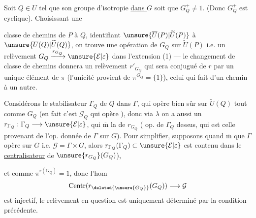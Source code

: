 Soit  $Q\in U$ tel que son groupe d'isotropie   \uline{dans $G$} soit  que $G_Q^+\ne1$.
(Donc $G_Q^+$ est cyclique). Choisissant une

classe de chemins \inserted{$\lambda$} de $P$ à $Q$, identifiant $\unsure{\overline U(P)|\widetilde U(P)}$ à $\unsure{\overline U(Q)|\widetilde U(Q)}$, on trouve une opération de $G_Q$ sur $\widetilde U(P)$ i.e. un relèvement $G_Q\xrightarrow{r_{G_Q}}\unsure{\mathcal E|\varepsilon}$ dans l'extension (1) --- le changement de classe de chemins  donnera un relèvement $r'_{G_Q}$ qui  sera conjugué de $r$ par un unique élément de $\pi$  (l'unicité provient de $\pi^{G_Q}=\{1\}$),  celui qui fait  d'un chemin à un autre.

Considérons le stabilisateur $\Gamma_Q$ de $Q$ dans $\Gamma$,  qui opère bien sûr sur $\widetilde U(Q)$ tout comme $G_Q$ (en fait c'est $\mathcal G_Q$ qui opère  \unsure{\dots}), donc via $\lambda$ on a aussi un  $r_{\Gamma_Q}:\Gamma_Q\longrightarrow\unsure{\mathcal E|\varepsilon}$, qui  $\overline{\mathrm m}$ la  de  $r_{G_Q}$ ( op. de  $\Gamma_Q$ dessus, qui est celle provenant de l'op. donnée de $\Gamma$ sur $G$).
Pour simplifier, supposons quand $\overline{\mathrm m}$ que $\Gamma$ opère  sur $G$ i.e. $\mathcal G=\Gamma\times G$, alors $r_{\Gamma_Q}(\Gamma_Q)\subset\unsure{\mathcal E|\varepsilon}$ est contenu dans le \uline{centralisateur} de  $\unsure{r_{G_Q}}(G_Q)$),

et comme $\pi^{r(G_Q)}=1$, donc l'hom
\[
\operatorname{Centr}(r_{\deleted{\unsure{G_Q}}}(G_Q))\longrightarrow\mathcal G
\]
est injectif, le relèvement en question  est uniquement déterminé par la condition précédente.

